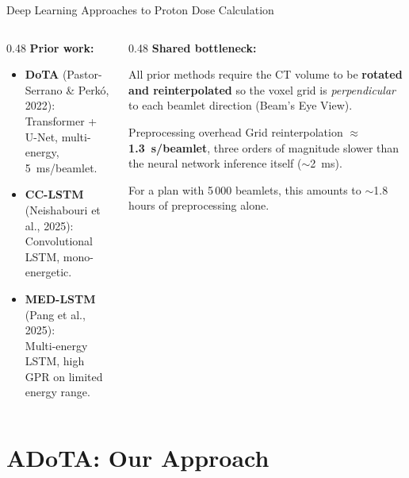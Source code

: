 \documentclass[aspectratio=169, 10pt]{beamer}
\begin{document}
\begin{frame}{Deep Learning Approaches to Proton Dose Calculation}
  \begin{columns}[T]
    \begin{column}{0.48\textwidth}
      \textbf{Prior work:}
      \begin{itemize}\setlength{\itemsep}{3pt}
        \item \textbf{DoTA} (Pastor-Serrano \& Perkó, 2022):\\
              Transformer + U-Net, multi-energy,\\
              \SI{5}{ms}/beamlet.
        \item \textbf{CC-LSTM} (Neishabouri et al., 2025):\\
              Convolutional LSTM,
              mono-energetic.
        \item \textbf{MED-LSTM} (Pang et al., 2025):\\
              Multi-energy LSTM, high GPR on limited energy range.
      \end{itemize}
    \end{column}
    \begin{column}{0.48\textwidth}
      \textbf{Shared bottleneck:}

      \vspace{4pt}
      All prior methods require the CT volume to be
      \textbf{rotated and reinterpolated} so the voxel grid is
      \emph{perpendicular} to each beamlet direction
      (Beam's Eye View).

      \vspace{6pt}
      \begin{alertblock}{Preprocessing overhead}
        Grid reinterpolation $\approx$ \textbf{\SI{1.3}{s}/beamlet},
        three orders of magnitude slower than the neural network
        inference itself ($\sim$\SI{2}{ms}).
      \end{alertblock}

      \vspace{4pt}
      {\small For a plan with 5\,000 beamlets, this amounts to
       $\sim$1.8\,hours of preprocessing alone.}
    \end{column}
  \end{columns}
\end{frame}

\section{ADoTA: Our Approach}
\end{document}
